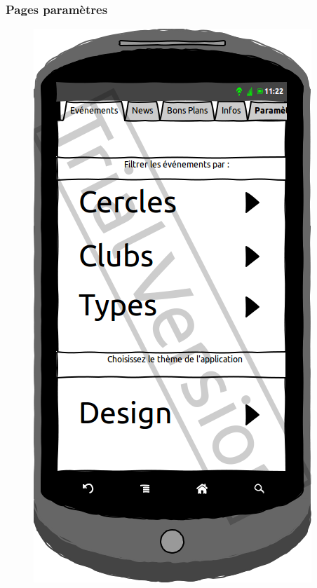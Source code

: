 \documentclass[a4paper, 11px]{article}
\begin{document}
\subsubsection{Pages paramètres}
\begin{figure}[htbp]
	\begin{minipage}[c]{.50\linewidth}
		\begin{center}
			\includegraphics[scale=0.3]{../../Sketch/Android/Param.png}
		\end{center}
	\end{minipage}
	\hfill
	\begin{minipage}[c]{.50\linewidth}
		\begin{center}

\end{center}
\end{minipage}
\end{figure}
\end{document}
